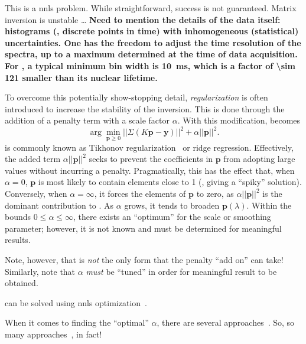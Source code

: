 This is a \gls{nnls} problem.
While straightforward, success is not guaranteed.
Matrix inversion is unstable \dots
\textbf{
Need to mention the details of the data itself:
histograms (, discrete points in time) with inhomogeneous (statistical) uncertainties.
One has the freedom to adjust the time resolution of the spectra, up to a maximum determined at the time of data acquisition.
For , a typical minimum bin width is \SI{10}{\milli\second}, which is a factor of \num{\sim 121} smaller than its nuclear lifetime.
}


To overcome this potentially show-stopping detail, \emph{regularization} is often introduced to increase the stability of the inversion.
This is done through the addition of a penalty term with a scale factor $\alpha$.
With this modification,  becomes
%
\begin{equation}
\label{eq:rnnls}
   \arg \min_{\mathbf{p} \geq 0} || \Sigma(K \mathbf{p} - \mathbf{y}) ||^{2} + \alpha || \mathbf{p} ||^{2} .
\end{equation}
%
 is commonly known as Tikhonov regularization~\cite{1995-Tikhonov-NMSIPP} or ridge regression.
Effectively, the added term $\alpha || \mathbf{p} ||^{2}$ seeks to prevent the coefficients in $\mathbf{p}$ from adopting large values without incurring a penalty.
Pragmatically, this has the effect that, when $\alpha = 0$, $\mathbf{p}$ is most likely to contain elements close to 1 (, giving a ``spiky'' solution).
Conversely, when $\alpha = \infty$, it forces the elements of $\mathbf{p}$ to zero, as $\alpha || \mathbf{p} ||^{2}$ is the dominant contribution to .
As $\alpha$ grows, it tends to broaden $\mathbf{p}(\lambda)$.
Within the bounds $0 \leq \alpha \leq \infty$, there exists an ``optimum'' for the scale or smoothing parameter;
however, it is not known  and must be determined for meaningful results.




Note, however, that  is \emph{not} the only form that the penalty ``add on'' can take!
Similarly, note that $\alpha$ \emph{must} be ``tuned'' in order for meaningful result to be obtained.


 can be solved using \gls{nnls} optimization~\cite{1995-Lawson-SLSP}.



When it comes to finding the ``optimal'' $\alpha$, there are several approaches~\cite{2001-Kilmer-SIAMJMAA-22-1204}.
So, so many approaches~\cite{2011-Bauer-MCS-81-1795}, in fact!



